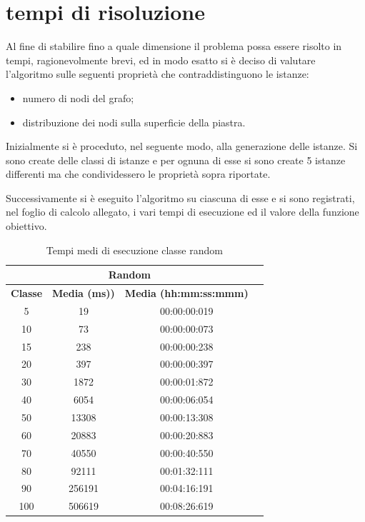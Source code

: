 %
%
\section[Tempi di risoluzione]{tempi di risoluzione}
\label{pt1:time}
Al fine di stabilire fino a quale dimensione il problema possa essere risolto in tempi, ragionevolmente brevi, ed in modo esatto si è deciso di valutare l'algoritmo sulle seguenti proprietà che contraddistinguono le istanze:

\begin{itemize}
\item numero di nodi del grafo;
\item distribuzione dei nodi sulla superficie della piastra.
\end{itemize}

Inizialmente si è proceduto, nel seguente modo, alla generazione delle istanze. Si sono create delle classi di istanze e per ognuna di esse si sono create 5 istanze differenti ma che condividessero le proprietà sopra riportate.

Successivamente si è eseguito l'algoritmo su ciascuna di esse e si sono registrati, nel foglio di calcolo allegato, i vari tempi di esecuzione ed il valore della funzione obiettivo.

\begin{table}[htbp]
\centering
\label{pt1:time:tabular_random}
\begin{tabular}{|c|c|c|c|}
\hline
\multicolumn{3}{|c|}{Random}\\
\hline
\textbf{Classe} & \textbf{Media (ms))} & \textbf{Media (hh:mm:ss:mmm)}\\
\hline
5   &     19 & 00:00:00:019\\
\hline
10  &     73 & 00:00:00:073\\
\hline
15  &    238 & 00:00:00:238\\
\hline
20  &    397 & 00:00:00:397\\
\hline
30  &   1872 & 00:00:01:872\\
\hline
40  &   6054 & 00:00:06:054\\
\hline
50  &  13308 & 00:00:13:308\\
\hline
60  &  20883 & 00:00:20:883\\
\hline
70  &  40550 & 00:00:40:550\\
\hline
80  &  92111 & 00:01:32:111\\
\hline
90  & 256191 & 00:04:16:191\\
\hline
100 & 506619 & 00:08:26:619\\
\hline
\end{tabular}
\caption{Tempi medi di esecuzione classe random}
\end{table}

